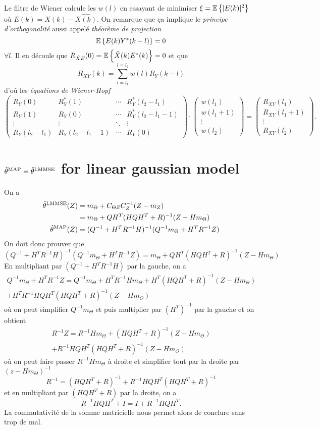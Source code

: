 Le filtre de Wiener calcule les $w(l)$ en essayant
de minimiser $\xi = \mathbb{E}\left\{|E(k)|^2\right\}$
où $E(k) = X(k) - \hat{X(k)}$.
On remarque que ça implique
le \emph{principe d'orthogonalité} aussi appelé
\emph{théorème de projection}
\[ \mathbb{E}\left\{E(k)Y^*(k-l)\right\} = 0 \]
$\forall l$.
Il en découle que $R_{\hat{X}E}(0) = \mathbb{E}\left\{\hat{X}(k)E^*(k)\right\} = 0$
et que
\[ R_{XY}(k) = \sum_{l=l_1}^{l=l_2} w(l)R_Y(k-l) \]
d'où les \emph{équations de Wiener-Hopf}
\[
  \begin{pmatrix}
    R_Y(0) & R_Y^*(1) & \cdots & R_Y^*(l_2-l_1)\\
    R_Y(1) & R_Y(0) & \cdots & R_Y^*(l_2-l_1-1)\\
    \vdots & \vdots & \ddots & \vdots\\
    R_Y(l_2-l_1) & R_Y(l_2-l_1-1) & \cdots & R_Y(0)
  \end{pmatrix}
  \cdot
  \begin{pmatrix}
    w(l_1)\\w(l_1+1)\\\vdots\\w(l_2)
  \end{pmatrix}
  =
  \begin{pmatrix}
    R_{XY}(l_1)\\
    R_{XY}(l_1+1)\\
    \vdots\\
    R_{XY}(l_2)
  \end{pmatrix}.
\]


\annexe
\section{$\hat{\theta}^{\mathrm{MAP}} = \hat{\theta}^{\mathrm{LMMSE}}$ for linear gaussian model}
\label{ann:maplmmselingauss}
On a
\begin{align*}
  \hat{\theta}^{\mathrm{LMMSE}}(Z) & = m_\Theta + C_{\Theta Z}C_{Z}^{-1}(Z - m_Z)\\
                & = m_\Theta + QH^T(HQH^T+R)^{-1}(Z - Hm_\Theta)\\
  \hat{\theta}^{\mathrm{MAP}}(Z) & = (Q^{-1}+H^TR^{-1}H)^{-1}(Q^{-1}m_\Theta+H^TR^{-1}Z)
\end{align*}
On doit donc prouver que
\[ (Q^{-1}+H^TR^{-1}H)^{-1}(Q^{-1}m_\Theta+H^TR^{-1}Z) = m_\Theta + QH^T(HQH^T+R)^{-1}(Z - Hm_\Theta) \]
En multipliant par $(Q^{-1}+H^TR^{-1}H)$ par la gauche, on a
\begin{multline*}
   Q^{-1}m_\Theta+H^TR^{-1}Z = Q^{-1}m_\Theta + H^TR^{-1}H m_\Theta + H^T(HQH^T+R)^{-1}(Z - Hm_\Theta)\\
   + H^TR^{-1}HQH^T(HQH^T+R)^{-1}(Z - Hm_\Theta)
\end{multline*}
où on peut simplifier $Q^{-1}m_\Theta$ et puis multiplier par $(H^T)^{-1}$ par la gauche et on obtient
\begin{multline*}
  R^{-1}Z = R^{-1}H m_\Theta + (HQH^T+R)^{-1}(Z - Hm_\Theta)\\
  + R^{-1}HQH^T(HQH^T+R)^{-1}(Z - Hm_\Theta)
\end{multline*}
où on peut faire passer $R^{-1}Hm_\Theta$ à droite et simplifier tout par la droite par $(z-Hm_\Theta)^{-1}$
\[
  R^{-1} = (HQH^T+R)^{-1} + R^{-1}HQH^T(HQH^T+R)^{-1}
\]
et en multipliant par $(HQH^T+R)$ par la droite, on a
\[
  R^{-1}HQH^T + I = I + R^{-1}HQH^T.
\]
La commutativité de la somme matricielle nous permet alors de conclure sans trop de mal.


